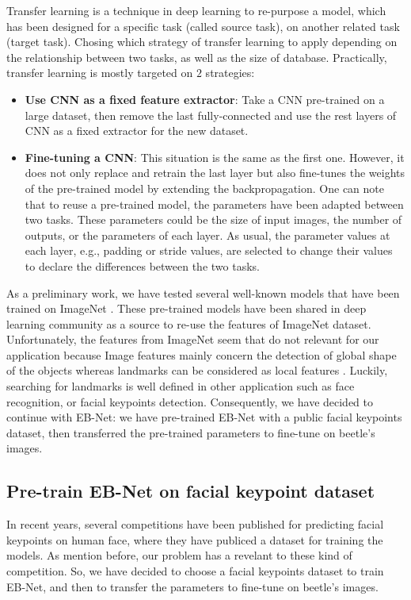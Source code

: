 \documentclass[review]{elsarticle}
\begin{document}
Transfer learning \cite{} is a technique in deep learning to re-purpose a model, which has been designed for a specific task (called source task), on another related task (target task). Chosing which strategy of transfer learning to apply depending on the relationship between two tasks, as well as the size of database. Practically, transfer learning is mostly targeted on $2$ strategies:
\begin{itemize}
	\item \textbf{Use CNN as a fixed feature extractor}: Take a CNN pre-trained on a large dataset, then remove the last fully-connected and use the rest layers of CNN as a fixed extractor for the new dataset.
	\item \textbf{Fine-tuning a CNN}: This situation is the same as the first one. However, it does not only replace and retrain the last layer but also fine-tunes the weights of the pre-trained model by extending the backpropagation. One can note that to reuse a pre-trained model, the parameters have been adapted between two tasks. These parameters could be the size of input images, the number of outputs, or the parameters of each layer. As usual, the parameter values at each layer, e.g., padding or stride values, are selected to change their values to declare the differences between the two tasks.
\end{itemize}

As a preliminary work, we have tested several well-known models \cite{} that have been trained on ImageNet \cite{}. These pre-trained models have been shared in deep learning community as a source to re-use the features of ImageNet dataset. Unfortunately, the features from ImageNet seem that do not relevant for our application because Image features mainly concern the detection of global shape of the objects whereas landmarks can be considered as local features \cite{}. Luckily, searching for landmarks is well defined in other application such as face recognition, or facial keypoints detection. Consequently, we have decided to continue with EB-Net: we have pre-trained EB-Net with a public facial keypoints dataset, then transferred the pre-trained parameters to fine-tune on beetle's images.

\subsection{Pre-train EB-Net on facial keypoint dataset}

In recent years, several competitions have been published for predicting facial keypoints on human face, where they have publiced a dataset for training the models. As mention before, our problem has a revelant to these kind of competition. So, we have decided to choose a facial keypoints dataset to train EB-Net, and then to transfer the parameters to fine-tune on beetle's images.
\end{document}
